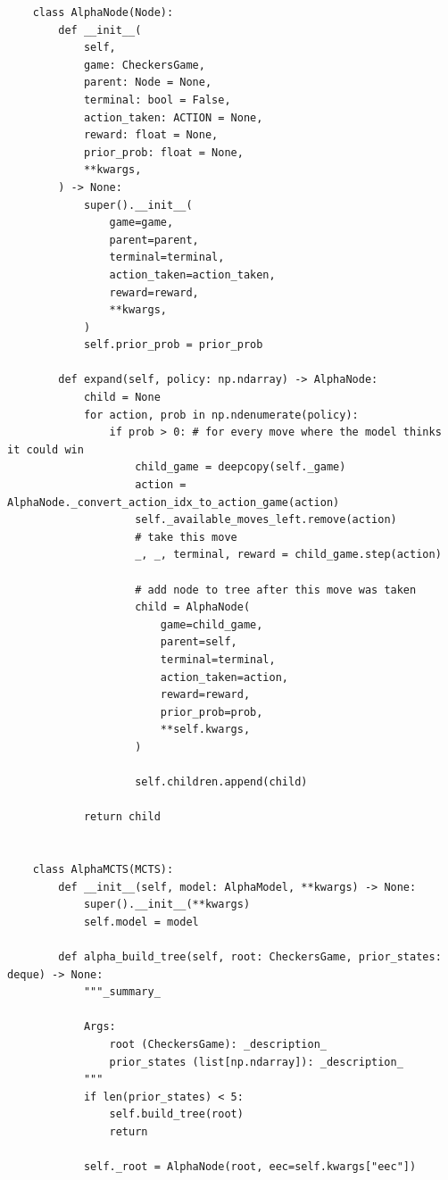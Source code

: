 \documentclass{article}
\begin{document}
    \begin{verbatim}
    class AlphaNode(Node):
        def __init__(
            self,
            game: CheckersGame,
            parent: Node = None,
            terminal: bool = False,
            action_taken: ACTION = None,
            reward: float = None,
            prior_prob: float = None,
            **kwargs,
        ) -> None:
            super().__init__(
                game=game,
                parent=parent,
                terminal=terminal,
                action_taken=action_taken,
                reward=reward,
                **kwargs,
            )
            self.prior_prob = prior_prob

        def expand(self, policy: np.ndarray) -> AlphaNode:
            child = None
            for action, prob in np.ndenumerate(policy):
                if prob > 0: # for every move where the model thinks it could win
                    child_game = deepcopy(self._game)
                    action = AlphaNode._convert_action_idx_to_action_game(action)
                    self._available_moves_left.remove(action)
                    # take this move
                    _, _, terminal, reward = child_game.step(action)

                    # add node to tree after this move was taken
                    child = AlphaNode(
                        game=child_game,
                        parent=self,
                        terminal=terminal,
                        action_taken=action,
                        reward=reward,
                        prior_prob=prob,
                        **self.kwargs,
                    )

                    self.children.append(child)

            return child


    class AlphaMCTS(MCTS):
        def __init__(self, model: AlphaModel, **kwargs) -> None:
            super().__init__(**kwargs)
            self.model = model

        def alpha_build_tree(self, root: CheckersGame, prior_states: deque) -> None:
            """_summary_

            Args:
                root (CheckersGame): _description_
                prior_states (list[np.ndarray]): _description_
            """
            if len(prior_states) < 5:
                self.build_tree(root)
                return

            self._root = AlphaNode(root, eec=self.kwargs["eec"])


\end{verbatim}
\end{document}
